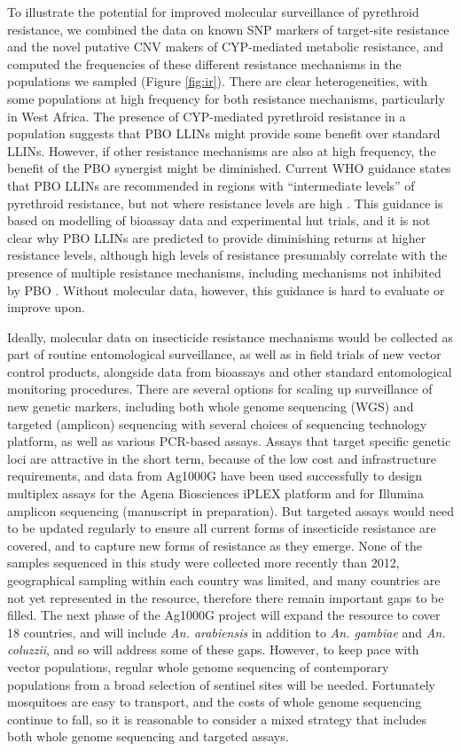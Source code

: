 \documentclass[a4paper,11pt,abstracton,hidelinks]{scrartcl}
\begin{document}
To illustrate the potential for improved molecular surveillance of pyrethroid resistance, we combined the data on known SNP markers of target-site resistance and the novel putative CNV makers of CYP-mediated metabolic resistance, and computed the frequencies of these different resistance mechanisms in the populations we sampled (Figure \ref{fig:ir}).
%
There are clear heterogeneities, with some populations at high frequency for both resistance mechanisms, particularly in West Africa.
%
The presence of CYP-mediated pyrethroid resistance in a population suggests that PBO LLINs might provide some benefit over standard LLINs.
%
However, if other resistance mechanisms are also at high frequency, the benefit of the PBO synergist might be diminished.
%
Current WHO guidance states that PBO LLINs are recommended in regions with ``intermediate levels'' of pyrethroid resistance, but not where resistance levels are high \cite{WHO2017}.
%
This guidance is based on modelling of bioassay data and experimental hut trials, and it is not clear why PBO LLINs are predicted to provide diminishing returns at higher resistance levels, although high levels of resistance presumably correlate with the presence of multiple resistance mechanisms, including mechanisms not inhibited by PBO \cite{Churcher2016}.
%
Without molecular data, however, this guidance is hard to evaluate or improve upon.


%
Ideally, molecular data on insecticide resistance mechanisms would be collected as part of routine entomological surveillance, as well as in field trials of new vector control products, alongside data from bioassays and other standard entomological monitoring procedures.
%
There are several options for scaling up surveillance of new genetic markers, including both whole genome sequencing (WGS) and targeted (amplicon) sequencing with several choices of sequencing technology platform, as well as various PCR-based assays.
%
Assays that target specific genetic loci are attractive in the short term, because of the low cost and infrastructure requirements, and data from Ag1000G have been used successfully to design multiplex assays for the Agena Biosciences iPLEX platform \cite{Lucas2019b} and for Illumina amplicon sequencing (manuscript in preparation).
% 
But targeted assays would need to be updated regularly to ensure all current forms of insecticide resistance are covered, and to capture new forms of resistance as they emerge.
%
None of the samples sequenced in this study were collected more recently than 2012, geographical sampling within each country was limited, and many countries are not yet represented in the resource, therefore there remain important gaps to be filled.
%
The next phase of the Ag1000G project will expand the resource to cover 18 countries, and will include \textit{An. arabiensis} in addition to \textit{An. gambiae} and \textit{An. coluzzii}, and so will address some of these gaps.
%
However, to keep pace with vector populations, regular whole genome sequencing of contemporary populations from a broad selection of sentinel sites will be needed.
%
Fortunately mosquitoes are easy to transport, and the costs of whole genome sequencing continue to fall, so it is reasonable to consider a mixed strategy that includes both whole genome sequencing and targeted assays.
\end{document}

